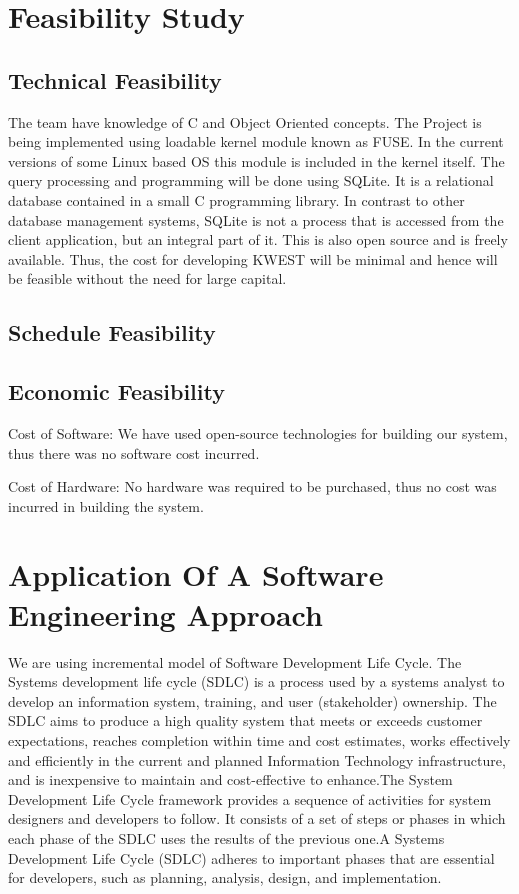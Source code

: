 \section{Feasibility Study}
\subsection{Technical Feasibility}
The team have knowledge of C and Object Oriented concepts. The Project is being implemented using loadable kernel module known as FUSE. In the current versions of some Linux based OS this module is included in the kernel itself.
The query processing and programming will be done using SQLite. It is a relational database contained in a small C programming library. In contrast to other database management systems, SQLite is not a process that is accessed from the client application, but an integral part of it. This is also open source and is freely available.
Thus, the cost for developing KWEST will be minimal and hence will be feasible without the need for large capital.
\subsection{Schedule Feasibility}
\subsection{Economic Feasibility}
Cost of Software: We have used open-source technologies for building our system, thus there was no software cost incurred.

Cost of Hardware: No hardware was required to be purchased, thus no cost was incurred in building the system.
\section{Application Of A Software Engineering Approach}
We are using incremental model of Software Development Life Cycle. The Systems development life cycle (SDLC) is a process used by a systems analyst to develop an information system, training, and user (stakeholder) ownership. The SDLC aims to produce a high quality system that meets or exceeds customer expectations, reaches completion within time and cost estimates, works effectively and efficiently in the current and planned Information Technology infrastructure, and is inexpensive to maintain and cost-effective to enhance.The System Development Life Cycle framework provides a sequence of activities for system designers and developers to follow. It consists of a set of steps or phases in which each phase of the SDLC uses the results of the previous one.A Systems Development Life Cycle (SDLC) adheres to important phases that are essential for developers, such as planning, analysis, design, and implementation.
